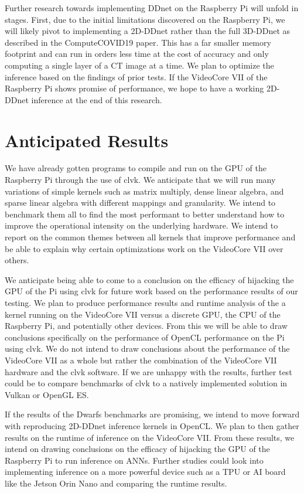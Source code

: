 \documentclass[conference]{IEEEtran}
\begin{document}
 Further research towards implementing DDnet on the Raspberry Pi will unfold in stages. First, due to the initial limitations 
 discovered on the Raspberry Pi, we will likely pivot to implementing a 2D-DDnet rather than the full 3D-DDnet 
 as described in the ComputeCOVID19 paper. This has a far smaller memory footprint and can run in orders less time at 
 the cost of accuracy and only computing a single layer of a CT image at a time. We plan to optimize the inference 
 based on the findings of prior tests. If the VideoCore VII of the Raspberry Pi shows promise of performance, 
 we hope to have a working 2D-DDnet inference at the end of this research.
 

 \section{Anticipated Results}

 We have already gotten programs to compile and run on the GPU of the Raspberry Pi through the use of clvk. 
 We anticipate that we will run many variations of simple kernels such as matrix multiply, dense linear algebra, 
 and sparse linear algebra with different mappings and granularity. We intend to benchmark them all to find the most 
 performant to better understand how to improve the operational intensity on the underlying hardware. We intend to 
 report on the common themes between all kernels that improve performance and be able to explain why 
 certain optimizations work on the VideoCore VII over others. 

 We anticipate being able to come to a conclusion on the efficacy of hijacking the GPU of the Pi using clvk for 
 future work based on the performance results of our testing. We plan to produce performance results and 
 runtime analysis of the a kernel running on the VideoCore VII versus a discrete GPU, the CPU of the Raspberry Pi, 
 and potentially other devices. From this we will be able to draw conclusions specifically on the performance 
 of OpenCL performance on the Pi using clvk. We do not intend to draw conclusions about the performance of the 
 VideoCore VII as a whole but rather the combination of the VideoCore VII hardware and the clvk software. 
 If we are unhappy with the results, further test could be to compare benchmarks of clvk to a natively 
 implemented solution in Vulkan or OpenGL ES.

 If the results of the Dwarfs benchmarks are promising, we intend to move forward with reproducing 2D-DDnet 
 inference kernels in OpenCL. We plan to then gather results on the runtime of inference on the VideoCore VII. 
 From these results, we intend on drawing conclusions on the efficacy of hijacking the GPU of the Raspberry Pi 
 to run inference on ANNs. Further studies could look into implementing inference on a more powerful device such as a TPU or AI board like 
 the Jetson Orin Nano and comparing the runtime results. 
\end{document}
